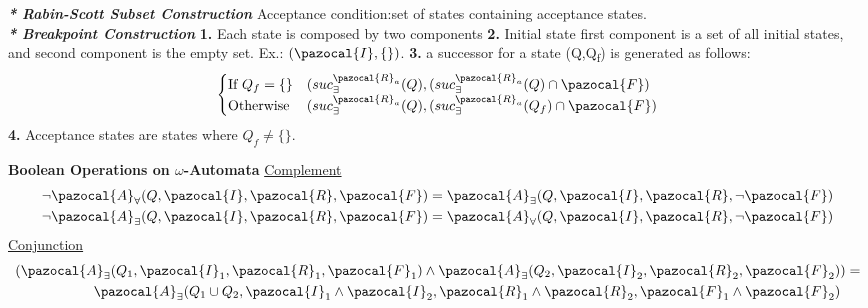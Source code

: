 \documentclass{article}
\newcommand{\Ib}{\pazocal{I}}
\newcommand{\Rb}{\pazocal{R}}
\newcommand{\Ab}{\pazocal{A}}
\newcommand{\Fb}{\pazocal{F}}
\begin{document}
\begin{multicols}{4}
\textbf{\textit{* Rabin-Scott Subset Construction}}
Acceptance condition:set of states containing acceptance states.\\
\textbf{\textit{* Breakpoint Construction}}
\textbf{1.} Each state is composed by two components
\textbf{2.} Initial state first component is a set of all initial states, and second component is the empty set. Ex.: $(\Ib,\{\})$.
\textbf{3.} a successor for a state (Q,Q\textsubscript{f}) is generated as follows:
\begin{align*}
\begin{cases}
\text{If }Q_f = \{\} & (suc^{\Rb_{a}}_{\exists}(Q), (suc^{\Rb_{a}}_{\exists}(Q) \cap \Fb) \\
\text{Otherwise} & (suc^{\Rb_{a}}_{\exists}(Q), (suc^{\Rb_{a}}_{\exists}(Q_f) \cap \Fb) \\
\end{cases}
\end{align*}
\textbf{4.} Acceptance states are states where $Q_f \neq \{\}$.

\textbf{Boolean Operations on $\omega$-Automata}
\underline{Complement}
\begin{align*}
\neg \Ab_{\forall}(Q,\Ib,\Rb,\Fb)=\Ab_{\exists}(Q,\Ib,\Rb,\neg \Fb) \\
\neg \Ab_{\exists}(Q,\Ib,\Rb,\Fb)=\Ab_{\forall}(Q,\Ib,\Rb,\neg \Fb)
\end{align*}
\underline{Conjunction}
\begin{align*}
(\Ab_{\exists}(Q_1,\Ib_1,\Rb_1,\Fb_1)\wedge \Ab_{\exists}(Q_2,\Ib_2,\Rb_2,\Fb_2)&)=\\
\Ab_{\exists}(Q_1 \cup Q_2,\Ib_1 \wedge \Ib_2,\Rb_1 \wedge \Rb_2,\Fb_1 \wedge \Fb_2)&
\end{align*}


\end{multicols}
\end{document}
